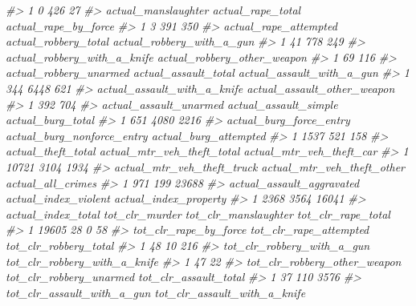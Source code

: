 \documentclass[
  12pt,
]{book}
\newenvironment{Shaded}{\begin{snugshade}}{\end{snugshade}}
\newcommand{\CommentTok}[1]{\textcolor[rgb]{0.56,0.35,0.01}{\textit{#1}}}
\begin{document}
\begin{Shaded}
\begin{Highlighting}[]
\CommentTok{\#> 1                           0                426            27}
\CommentTok{\#>   actual\_manslaughter actual\_rape\_total actual\_rape\_by\_force}
\CommentTok{\#> 1                   3               391                  350}
\CommentTok{\#>   actual\_rape\_attempted actual\_robbery\_total actual\_robbery\_with\_a\_gun}
\CommentTok{\#> 1                    41                  778                       249}
\CommentTok{\#>   actual\_robbery\_with\_a\_knife actual\_robbery\_other\_weapon}
\CommentTok{\#> 1                          69                         116}
\CommentTok{\#>   actual\_robbery\_unarmed actual\_assault\_total actual\_assault\_with\_a\_gun}
\CommentTok{\#> 1                    344                 6448                       621}
\CommentTok{\#>   actual\_assault\_with\_a\_knife actual\_assault\_other\_weapon}
\CommentTok{\#> 1                         392                         704}
\CommentTok{\#>   actual\_assault\_unarmed actual\_assault\_simple actual\_burg\_total}
\CommentTok{\#> 1                    651                  4080              2216}
\CommentTok{\#>   actual\_burg\_force\_entry actual\_burg\_nonforce\_entry actual\_burg\_attempted}
\CommentTok{\#> 1                    1537                        521                   158}
\CommentTok{\#>   actual\_theft\_total actual\_mtr\_veh\_theft\_total actual\_mtr\_veh\_theft\_car}
\CommentTok{\#> 1              10721                       3104                     1934}
\CommentTok{\#>   actual\_mtr\_veh\_theft\_truck actual\_mtr\_veh\_theft\_other actual\_all\_crimes}
\CommentTok{\#> 1                        971                        199             23688}
\CommentTok{\#>   actual\_assault\_aggravated actual\_index\_violent actual\_index\_property}
\CommentTok{\#> 1                      2368                 3564                 16041}
\CommentTok{\#>   actual\_index\_total tot\_clr\_murder tot\_clr\_manslaughter tot\_clr\_rape\_total}
\CommentTok{\#> 1              19605             28                    0                 58}
\CommentTok{\#>   tot\_clr\_rape\_by\_force tot\_clr\_rape\_attempted tot\_clr\_robbery\_total}
\CommentTok{\#> 1                    48                     10                   216}
\CommentTok{\#>   tot\_clr\_robbery\_with\_a\_gun tot\_clr\_robbery\_with\_a\_knife}
\CommentTok{\#> 1                         47                           22}
\CommentTok{\#>   tot\_clr\_robbery\_other\_weapon tot\_clr\_robbery\_unarmed tot\_clr\_assault\_total}
\CommentTok{\#> 1                           37                     110                  3576}
\CommentTok{\#>   tot\_clr\_assault\_with\_a\_gun tot\_clr\_assault\_with\_a\_knife}

\end{Highlighting}
\end{Shaded}
\end{document}
